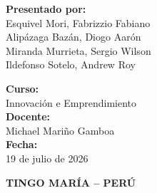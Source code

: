 \documentclass[12pt]{article}
\begin{document}
\begin{titlepage}
    \vspace{2.0cm}
    \begin{minipage}[t]{0.48\textwidth}
        \flushleft
        \fontsize{11pt}{13pt}\selectfont
        \textbf{Presentado por:} \\
        \vspace{0.2cm}
        \hspace{0.2cm} Esquivel Mori, Fabrizzio Fabiano \\
        \hspace{0.2cm} Alipázaga Bazán, Diogo Aarón \\
        \hspace{0.2cm} Miranda Murrieta, Sergio Wilson \\
        \hspace{0.2cm} Ildefonso Sotelo, Andrew Roy
    \end{minipage}
    \hfill
    \begin{minipage}[t]{0.48\textwidth}
        \flushleft
        \fontsize{11pt}{13pt}\selectfont
        \textbf{Curso:} \\
        \hspace{0.2cm} Innovación e Emprendimiento \\
        \vspace{0.3cm}
        \textbf{Docente:} \\
        \hspace{0.2cm} Michael Mariño Gamboa \\
        \vspace{0.3cm}
        \textbf{Fecha:} \\
        \hspace{0.2cm} 19 de julio de 2026
    \end{minipage}
    
    \vfill
    {\fontsize{11pt}{13pt}\selectfont\bfseries TINGO MARÍA – PERÚ} \\
    {\fontsize{10pt}{12pt}}
    
\end{titlepage}

\newpage

\renewcommand{\contentsname}{ÍNDICE}
\tableofcontents
\newpage

\end{document}
